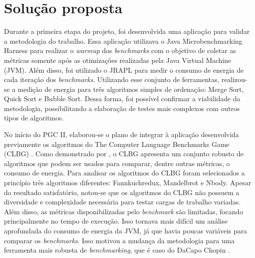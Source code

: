 \chapter{Solução proposta}

Durante a primeira etapa do projeto, foi desenvolvida uma aplicação para validar a metodologia do trabalho. Essa aplicação utilizava o Java Microbenchmarking Harness para realizar o \textit{warmup} dos \textit{benchmarks} com o objetivo de coletar as métricas somente após as otimizações realizadas pela Java Virtual Machine (JVM). Além disso, foi utilizado o JRAPL \cite{jrapl} para medir o consumo de energia de cada iteração dos \textit{benchmarks}. Utilizando esse conjunto de ferramentas, realizou-se a medição de energia para três algoritmos simples de ordenação: Merge Sort, Quick Sort e Bubble Sort. Dessa forma, foi possível confirmar a viabilidade da metodologia, possibilitando a elaboração de testes mais complexos com outros tipos de algoritmos.

No início do PGC II, elaborou-se o plano de integrar à aplicação desenvolvida previamente os algoritmos do The Computer Language Benchmarks Game (CLBG) \cite{benchmarksgame}. Como demonstrado por , o CLBG apresenta um conjunto robusto de algoritmos que podem ser usados para comparar, dentre outras métricas, o consumo de energia. Para analisar os algoritmos do CLBG foram selecionados a princípio três algoritmos diferentes: Fannkuchredux, Mandelbrot e Nbody. Apesar do resultado satisfatório, notou-se que os algoritmos do CLBG não possuem a diversidade e complexidade necessária para testar cargas de trabalho variadas. Além disso, as métricas disponibilizadas pelo \textit{benchmark} são limitadas, focando principalmente no tempo de execução. Isso tornava mais difícil um análise aprofundada do consumo de energia da JVM, já que havia poucas variáveis para comparar os \textit{benchmarks}. Isso motivou a mudança da metodologia para uma ferramenta mais robusta de \textit{benchmarking}, que é caso do DaCapo Chopin \cite{dacapochopin}.



